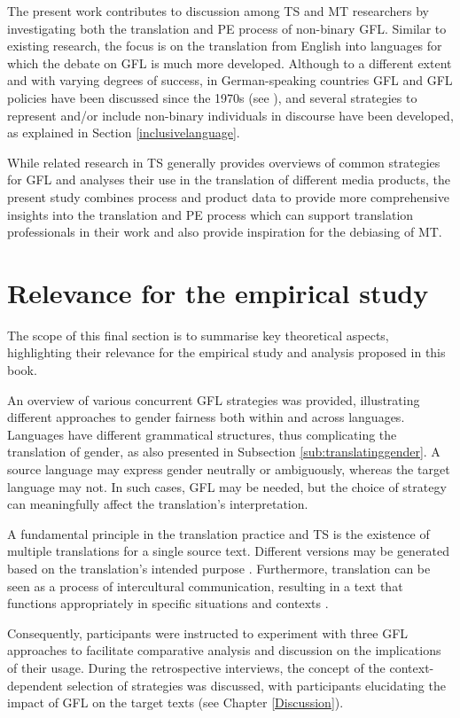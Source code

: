The present work contributes to discussion among TS and MT researchers by investigating both the translation and PE process of non-binary GFL. Similar to existing research, the focus is on the translation from English into languages for which the debate on GFL is much more developed. Although to a different extent and with varying degrees of success, in German-speaking countries GFL and GFL policies have been discussed since the 1970s (see \cite{sczesny2016can}), and several strategies to represent and/or include non-binary individuals in discourse have been developed, as explained in Section \ref{inclusivelanguage}. 

While related research in TS generally provides overviews of common strategies for GFL and analyses their use in the translation of different media products, the present study combines process and product data to provide more comprehensive insights into the translation and PE process which can support translation professionals in their work and also provide inspiration for the debiasing of MT. 

\section{Relevance for the empirical study}
The scope of this final section is to summarise key theoretical aspects, highlighting their relevance for the empirical study and analysis proposed in this book.

An overview of various concurrent GFL strategies was provided, illustrating different approaches to gender fairness both within and across languages. Languages have different grammatical structures, thus complicating the translation of gender, as also presented in Subsection \ref{sub:translatinggender}. A source language may express gender neutrally or ambiguously, whereas the target language may not. In such cases, GFL may be needed, but the choice of strategy can meaningfully affect the translation’s interpretation.

A fundamental principle in the translation practice and TS is the existence of multiple translations for a single source text. Different versions may be generated based on the translation's intended purpose \citep{reiss1984grundlegung}. Furthermore, translation can be seen as a process of intercultural communication, resulting in a text that functions appropriately in specific situations and contexts \citep{holz1984translatorisches}. 

Consequently, participants were instructed to experiment with three GFL approaches to facilitate comparative analysis and discussion on the implications of their usage. During the retrospective interviews, the concept of the context-dependent selection of strategies was discussed, with participants elucidating the impact of GFL on the target texts (see Chapter \ref{Discussion}). 

